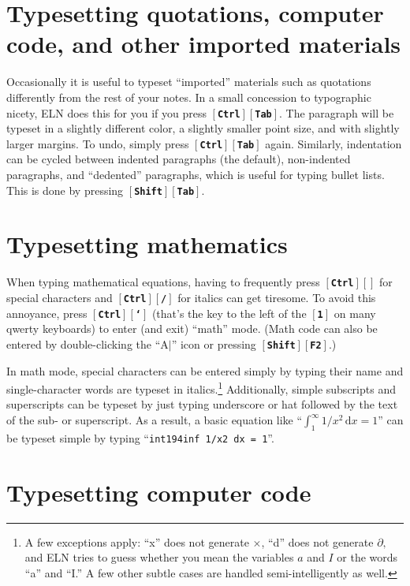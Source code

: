 \documentclass[11pt]{report}
\def\keystroke#1{$\left[\right.\!${\tt\bfseries #1}$\!\left.\right]$}
\def\key#1{\keystroke{#1}}
\def\keycombo#1#2{\keystroke{#1}\keystroke{#2}}
\def\keycontrol#1{\keycombo{Ctrl}{#1}}
\def\keyshift#1{\keycombo{Shift}{#1}}
\def\keyctrlbackslash{\keycontrol{\char92}}
\begin{document}
\section{Typesetting quotations, computer code, and other imported materials}

Occasionally it is useful to typeset ``imported'' materials such as
quotations differently from the rest of your notes. In a small
concession to typographic nicety, ELN does this for you if you press
\keycontrol{Tab}.  The paragraph will be typeset in a slightly
different color, a slightly smaller point size, and with slightly
larger margins. To undo, simply press \keycontrol{Tab}
again. Similarly, indentation can be cycled between indented
paragraphs (the default), non-indented paragraphs, and ``dedented''
paragraphs, which is useful for typing bullet lists. This is done by
 pressing \keyshift{Tab}.

\section{Typesetting mathematics}

When typing mathematical equations, having to frequently press
\keyctrlbackslash{} for special characters and \keycontrol{/} for
italics can get tiresome. To avoid this annoyance, press
\keycontrol{`} (that's the key to the left of the \key{1} on many
qwerty keyboards) to enter (and exit) ``math'' mode. (Math code can
also be entered by double-clicking the ``A\hbox{$|$}'' icon
or pressing \keyshift{F2}.)

In math mode, special characters can be entered simply by typing their
name and single-character words are typeset in italics.\footnote{A few
  exceptions apply: ``x'' does not generate $\times$, ``d'' does not
  generate $\partial,$ and ELN tries to guess whether you mean the
  variables $a$ and $I$ or the words ``a'' and ``I.'' A few other
  subtle cases are handled semi-intelligently as well.} Additionally,
simple subscripts and superscripts can be typeset by just typing
underscore or hat followed by the text of the sub- or superscript. As
a result, a basic equation like ``$\int_1^\infty 1/x^2\, \mathrm{d}x =
1$'' can be typeset simple by typing ``{\tt{int1\char94inf
    1/x2 dx = 1}}''.

\section{Typesetting computer code}\label{sec:codemode}
\end{document}
